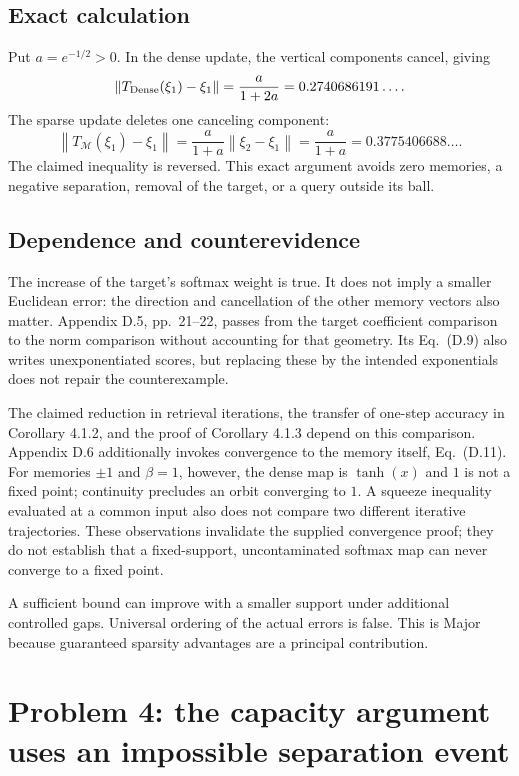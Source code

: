 \documentclass[10pt]{article}
\begin{document}
\subsection*{Exact calculation}
Put \(a=e^{-1/2}>0\). In the dense update, the vertical components cancel, giving \[\left\lVert T_{\rm Dense}(\xi_1)-\xi_1\right\rVert=\frac{a}{1+2a}
 =0.2740686191\ldots.\] The sparse update deletes one canceling component: \[\left\lVert T_\mathcal M(\xi_1)-\xi_1\right\rVert
 =\frac{a}{1+a}\left\lVert \xi_2-\xi_1\right\rVert
 =\frac{a}{1+a}=0.3775406688\ldots.\] The claimed inequality is reversed. This exact argument avoids zero memories, a negative separation, removal of the target, or a query outside its ball.\par
\subsection*{Dependence and counterevidence}
The increase of the target’s softmax weight is true. It does not imply a smaller Euclidean error: the direction and cancellation of the other memory vectors also matter. Appendix D.5, pp. 21–22, passes from the target coefficient comparison to the norm comparison without accounting for that geometry. Its Eq. (D.9) also writes unexponentiated scores, but replacing these by the intended exponentials does not repair the counterexample.\par
The claimed reduction in retrieval iterations, the transfer of one-step accuracy in Corollary 4.1.2, and the proof of Corollary 4.1.3 depend on this comparison. Appendix D.6 additionally invokes convergence to the memory itself, Eq. (D.11). For memories \(\pm1\) and \(\beta=1\), however, the dense map is \(\tanh(x)\) and \(1\) is not a fixed point; continuity precludes an orbit converging to \(1\). A squeeze inequality evaluated at a common input also does not compare two different iterative trajectories. These observations invalidate the supplied convergence proof; they do not establish that a fixed-support, uncontaminated softmax map can never converge to a fixed point.\par
A sufficient bound can improve with a smaller support under additional controlled gaps. Universal ordering of the actual errors is false. This is Major because guaranteed sparsity advantages are a principal contribution.\par
\section*{Problem 4: the capacity argument uses an impossible separation event}
\end{document}
